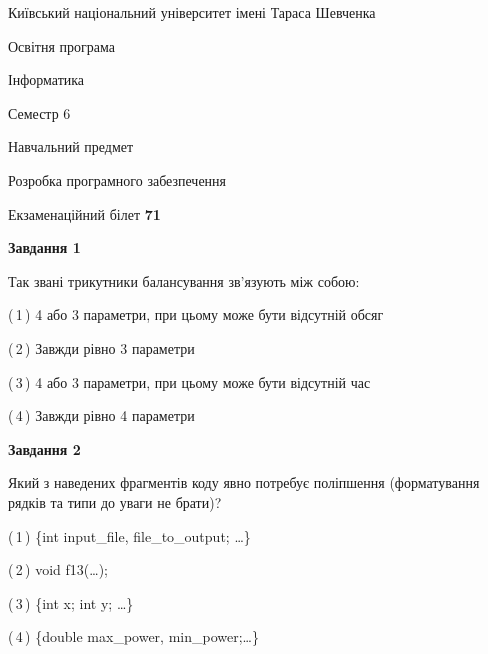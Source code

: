 \documentclass[10pt, ukrainian]{article}
\begin{document}
{{\begin {small}\par
{ \center  Київський національний університет імені Тараса Шевченка \par}
{\parbox {5 cm}{Освітня програма \hfill}{\parbox {7 cm}{Інформатика \hfill}}\parbox {6 cm}{\hfill Семестр 6}}\par
{\parbox {5 cm} {Навчальний предмет \hfill}\parbox {7 cm}{Розробка програмного забезпечення \hfill}\parbox {6cm}{\hfill}\par}\vspace{-7pt} \end{small}}{\center Екзаменаційний білет \No \textbf
{ 71 }\par}}
{
\begin {large}
{\begin {center}\textbf{Завдання 1}\end {center}}\par
Так звані трикутники балансування зв'язують між собою:\par
\vspace{2mm}



(\,1\,) 4 або 3 параметри, при цьому може бути відсутній обсяг %



(\,2\,) Завжди рівно 3 параметри%



(\,3\,) 4 або 3 параметри, при цьому може бути відсутній час%



(\,4\,) Завжди рівно 4 параметри%


{\begin {center}\textbf{Завдання 2}\end {center}}\par
Який з наведених фрагментів коду явно потребує поліпшення (форматування рядків та типи до уваги не брати)?\par
\vspace{2mm}



(\,1\,) \{int input\_file, file\_to\_output; …\}%



(\,2\,) void f13(…);%



(\,3\,) \{int x; int y; …\}%



(\,4\,) \{double max\_power, min\_power;…\} %



\end{large}}
\end{document}
